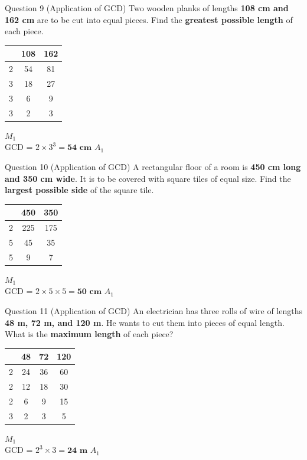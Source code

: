 \documentclass[12pt, a4paper, oneside]{article}
\begin{document}
\begin{solvingbox}{Question 9 (Application of GCD)}
Two wooden planks of lengths \textbf{108 cm and 162 cm} are to be cut into equal pieces. Find the \textbf{greatest possible length} of each piece. \\
\begin{tabular}{|c|c|c|} \hline
    & \textbf{108} & \textbf{162} \\ \hline
    2 & 54 & 81 \\ \hline
    3 & 18 & 27 \\ \hline
    3 & 6 & 9 \\ \hline
    3 & 2 & 3 \\ \hline
\end{tabular} \hfill $M_1$ \\
GCD = $2 \times 3^3 = \mathbf{54\text{ cm}}$ \hfill $A_1$
\end{solvingbox}
\begin{solvingbox}{Question 10 (Application of GCD)}
A rectangular floor of a room is \textbf{450 cm long and 350 cm wide}. It is to be covered with square tiles of equal size. Find the \textbf{largest possible side} of the square tile. \\
\begin{tabular}{|c|c|c|} \hline
    & \textbf{450} & \textbf{350} \\ \hline
    2 & 225 & 175 \\ \hline
    5 & 45 & 35 \\ \hline
    5 & 9 & 7 \\ \hline
\end{tabular} \hfill $M_1$ \\
GCD = $2 \times 5 \times 5 = \mathbf{50\text{ cm}}$ \hfill $A_1$
\end{solvingbox}

\begin{solvingbox}{Question 11 (Application of GCD)}
An electrician has three rolls of wire of lengths \textbf{48 m, 72 m, and 120 m}. He wants to cut them into pieces of equal length. What is the \textbf{maximum length} of each piece? \\
\begin{tabular}{|c|c|c|c|} \hline
    & \textbf{48} & \textbf{72} & \textbf{120} \\ \hline
    2 & 24 & 36 & 60 \\ \hline
    2 & 12 & 18 & 30 \\ \hline
    2 & 6 & 9 & 15 \\ \hline
    3 & 2 & 3 & 5 \\ \hline
\end{tabular} \hfill $M_1$ \\
GCD = $2^3 \times 3 = \mathbf{24\text{ m}}$ \hfill $A_1$
\end{solvingbox}
\end{document}

